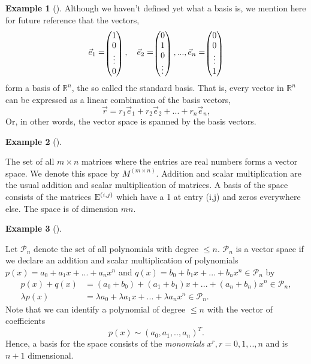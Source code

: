 \documentclass[
  a4paper,
  DIV=11,
  numbers=noendperiod,
  oneside]{scrreprt}
\theoremstyle{definition}
\newtheorem{example}{Example}[chapter]
\theoremstyle{remark}
\begin{document}
\begin{example}[]
Although we haven't defined yet what a basis is, we mention here for
future reference that the vectors,
\[\vec{e}_{1} =  \scriptscriptstyle \begin{pmatrix}   1\\ 0 \\ \vdots \\ 0   \end{pmatrix} \textstyle, \quad  \vec{e}_{2} =  \scriptscriptstyle \begin{pmatrix}   0\\ 1 \\ 0 \\ \vdots  \end{pmatrix} \textstyle, ...    ,\vec{e}_{n} =  \scriptscriptstyle \begin{pmatrix}   0\\ 0 \\ \vdots \\ 1   \end{pmatrix} \textstyle\]
form a basis of \(\mathbb{R}^{n}\), the so called the standard basis.
That is, every vector in \(\mathbb{R}^{n}\) can be expressed as a linear
combination of the basis vectors,
\[\vec{r} = r_{1} \vec{e}_{1} + r_{2} \vec{e}_{2} + ... + r_{n} \vec{e}_{n} ,\]
Or, in other words, the vector space is spanned by the basis vectors.

\end{example}

\begin{example}[]\protect\hypertarget{exm-vktspace5}{}\label{exm-vktspace5}

The set of all \(m\times n\) matrices where the entries are real numbers
forms a vector space. We denote this space by \(M^{(m \times n)}\).
Addition and scalar multiplication are the usual addition and scalar
multiplication of matrices. A basis of the space consists of the
matrices \({\rm E}^{(i,j)}\) which have a 1 at entry (i,j) and zeros
everywhere else. The space is of dimension \(m n\).

\end{example}

\begin{example}[]\protect\hypertarget{exm-vktspace6}{}\label{exm-vktspace6}

Let \(\mathcal{P}_{n}\) denote the set of all polynomials with degree
\(\leq n\). \(\mathcal{P}_{n}\) is a vector space if we declare an
addition and scalar multiplication of polynomials
\(p(x)= a_{0} + a_{1}x + ...+a_{n} x^{n}\) and
\(q(x)= b_{0} + b_{1}x + ...+b_{n} x^{n}\)\(\in \mathcal{P}_{n}\) by
\[\begin{aligned}
p(x)+q(x) &= (a_{0}+ b_{0}) + (a_{1} + b_{1}) x + ...+(a_{n}+ b_{n}) x^{n}   \in \mathcal{P}_{n} ,  \\
\lambda p(x) &=  \lambda a_{0} +  \lambda a_{1}x + ...+ \lambda a_{n} x^{n}  \in \mathcal{P}_{n} . 
\end{aligned}\] Note that we can identify a polynomial of degree
\(\leq n\) with the vector of coefficients
\[p(x) \sim  (a_{0}, a_{1},.., a_{n})^{T} .\] Hence, a basis for the
space consists of the \emph{monomials} \(x^{r}, r=0,1, ..,n\) and is
\(n+1\) dimensional.

\end{example}
\end{document}
